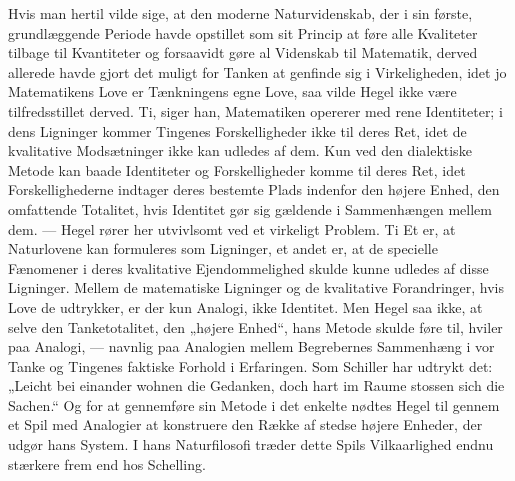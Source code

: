 \documentclass[12pt,a4paper,openany]{book}
\newcommand{\opage}[1]{\marginnote{\footnotesize\textit{[#1]}}}
\begin{document}
Hvis man hertil vilde sige, at den moderne Naturvidenskab, der
i sin første, grundlæggende Periode havde opstillet som sit Princip
at føre alle Kvaliteter tilbage til Kvantiteter og forsaavidt gøre al
Videnskab til Matematik, derved allerede havde gjort det muligt for
Tanken at genfinde sig i Virkeligheden, idet jo Matematikens Love
er Tænkningens egne Love, saa vilde Hegel ikke være tilfredsstillet
derved. Ti, siger han, Matematiken opererer med rene Identiteter;
\opage{11}i dens Ligninger kommer Tingenes Forskelligheder ikke til deres
Ret, idet de kvalitative Modsætninger ikke kan udledes af dem. Kun
ved den dialektiske Metode kan baade Identiteter og Forskelligheder
komme til deres Ret, idet Forskellighederne indtager deres bestemte
Plads indenfor den højere Enhed, den omfattende Totalitet, hvis
Identitet gør sig gældende i Sammenhængen mellem dem. --- Hegel
rører her utvivlsomt ved et virkeligt Problem. Ti Et er, at Naturlovene
kan formuleres som Ligninger, et andet er, at de specielle
Fænomener i deres kvalitative Ejendommelighed skulde kunne udledes
af disse Ligninger. Mellem de matematiske Ligninger og de
kvalitative Forandringer, hvis Love de udtrykker, er der kun Analogi,
ikke Identitet. Men Hegel saa ikke, at selve den Tanketotalitet,
den „højere Enhed“, hans Metode skulde føre til, hviler paa Analogi,
--- navnlig paa Analogien mellem Begrebernes Sammenhæng i vor
Tanke og Tingenes faktiske Forhold i Erfaringen. Som Schiller har
udtrykt det: „Leicht bei einander wohnen die Gedanken, doch hart
im Raume stossen sich die Sachen.“ Og for at gennemføre sin Metode
i det enkelte nødtes Hegel til gennem et Spil med Analogier at
konstruere den Række af stedse højere Enheder, der udgør hans
System. I hans Naturfilosofi træder dette Spils Vilkaarlighed endnu
stærkere frem end hos Schelling.
\end{document}
